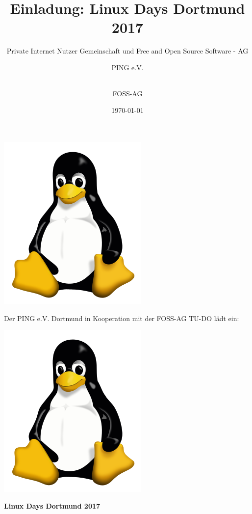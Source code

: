 \documentclass{beamer}
\author{
	PING e.V.
	\and \\
	FOSS-AG
}
\date{\today}
\title{Einladung: Linux Days Dortmund 2017}
\subtitle{\textcolor{black}{P}rivate \textcolor{black}{I}nternet \textcolor{black}{N}utzer \textcolor{black}{G}emeinschaft und \textcolor{black}{F}ree and \textcolor{black}{O}pen \textcolor{black}{S}ource \textcolor{black}{S}oftware \textcolor{black}{- AG}}
\begin{document}
	
	\begin{frame}
		\begin{center}
			\hspace{-0.9cm}\begin{minipage}{0.12\linewidth}
				\includegraphics[scale=0.1]{tux}
			\end{minipage}
			\begin{minipage}{0.9\linewidth}
				{\scriptsize Der PING e.V. Dortmund in Kooperation mit der FOSS-AG TU-DO lädt ein:}
				\begin{minipage}{0.01\linewidth}
					\includegraphics[scale=0.1]{tux}
				\end{minipage}
			\end{minipage}
			
			\vspace{0.2cm}
			{\large \textbf{Linux Days Dortmund 2017}}
		\end{center}
	

\end{frame}
\end{document}
